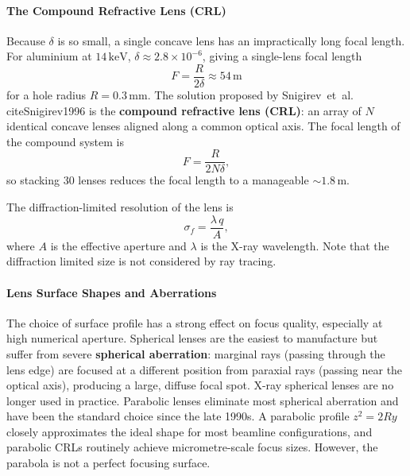 \paragraph{The Compound Refractive Lens (CRL)}
Because $\delta$ is so small, a single concave lens has an impractically long
focal length.  For aluminium at $14\,\mathrm{keV}$,
$\delta \approx 2.8\times10^{-6}$, giving a single-lens focal length
%
\begin{equation}
  F = \frac{R}{2\delta} \approx 54\,\mathrm{m}
\end{equation}
%
for a hole radius $R = 0.3\,\mathrm{mm}$.  The solution proposed by
Snigirev~et~al.\ \\cite{Snigirev1996} is the \textbf{compound refractive lens
(CRL)}: an array of $N$ identical concave lenses aligned along a common optical
axis.  The focal length of the compound system is
%
\begin{equation}
  F = \frac{R}{2N\delta},
  \label{eq:focal}
\end{equation}
%
so stacking 30 lenses reduces the focal length to a manageable $\sim1.8\,\mathrm{m}$.

The
diffraction-limited resolution of the lens is
\begin{equation}
  \sigma_f = \frac{\lambda\, q}{A},
\end{equation}
%
where $A$ is the effective aperture and $\lambda$ is the X-ray wavelength. Note that the diffraction limited size is not considered by ray tracing.  

\paragraph{Lens Surface Shapes and Aberrations}

The choice of surface profile has a strong effect on focus quality, especially
at high numerical aperture.
Spherical lenses are the easiest to manufacture but suffer from severe
\textbf{spherical aberration}: marginal rays (passing through the lens edge)
are focused at a different position from paraxial rays (passing near the
optical axis), producing a large, diffuse focal spot.  X-ray spherical lenses
are no longer used in practice.
Parabolic lenses eliminate most spherical aberration and have been the standard
choice since the late 1990s.  A parabolic profile $z^2 = 2Ry$ closely
approximates the ideal shape for most beamline configurations, and parabolic
CRLs routinely achieve micrometre-scale focus sizes. However, the parabola is
not a perfect focusing surface.

